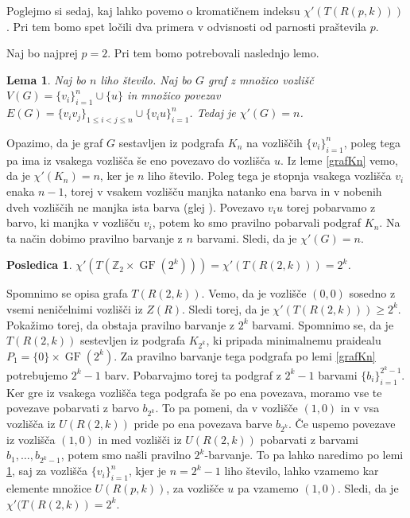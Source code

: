 \documentclass[a4paper, 12pt]{amsart}
\theoremstyle{definition} %
\theoremstyle{plain} %
\newtheorem{lema}[definicija]{Lema}
\newtheorem{posledica}[definicija]{Posledica}
\newcommand{\Z}{\mathbb Z}
\DeclareMathOperator{\GF}{GF}
\begin{document}
Poglejmo si sedaj, kaj lahko povemo o kromatičnem indeksu $\chi'(T(R(p,k)))$.  Pri tem bomo spet ločili dva primera v odvisnosti od parnosti praštevila $p$.

Naj bo najprej $p=2$. Pri tem bomo potrebovali naslednjo lemo.

\begin{lema}
\label{nLihoStozecKn}
Naj bo $n$ liho število. Naj bo $G$ graf z množico vozlišč $V(G) = \{v_i\}_{i=1}^n \cup \{u\}$ in množico povezav $E(G) = \{v_i v_j\}_{1\le i < j\le n} \cup \{v_i u\}_{i=1}^n$. Tedaj je $\chi'(G) = n$.
\end{lema}

\proof
Opazimo, da je graf $G$ sestavljen iz podgrafa $K_n$ na vozliščih $\{v_i\}_{i=1}^n$, poleg tega pa ima iz vsakega vozlišča še eno povezavo do vozlišča $u$. Iz leme \ref{grafKn} vemo, da je $\chi'(K_n)  = n$, ker je $n$ liho število. Poleg tega je stopnja vsakega vozlišča $v_i$ enaka $n-1$, torej v vsakem vozlišču manjka natanko ena barva in v nobenih dveh vozliščih ne manjka ista barva (glej \cite{diploma}). Povezavo $v_i u$ torej pobarvamo z barvo, ki manjka v vozlišču $v_i$, potem ko smo pravilno pobarvali podgraf $K_n$. Na ta način dobimo pravilno barvanje z $n$ barvami. Sledi, da je $\chi'(G) = n$.
\endproof

\begin{posledica}
\label{barvanjeT(R(2,k))}
$\chi'(T(\Z_2 \times \GF(2^k))) = \chi'(T(R(2,k))) = 2^k$.
\end{posledica}

\proof
Spomnimo se opisa grafa $T(R(2,k))$. Vemo, da je vozlišče $(0,0)$ sosedno z vsemi neničelnimi vozlišči iz $Z(R)$. Sledi torej, da je $\chi'(T(R(2,k))) \ge 2^k$. Pokažimo torej, da obstaja pravilno barvanje z $2^k$ barvami. Spomnimo se, da je $T(R(2,k))$ sestevljen iz podgrafa $K_{2^k}$, ki pripada minimalnemu praidealu $P_1 = \{0\} \times \GF(2^k)$. Za pravilno barvanje tega podgrafa po lemi \ref{grafKn} potrebujemo $2^k - 1$ barv. Pobarvajmo torej ta podgraf z $2^k - 1 $ barvami $\{b_i\}_{i=1}^{2^k - 1}$. Ker gre iz vsakega vozlišča tega podgrafa še po ena povezava, moramo vse te povezave pobarvati z barvo $b_{2^k}$. To pa pomeni, da v vozlišče $(1,0)$ in v vsa vozlišča iz $U(R(2,k))$ pride po ena povezava barve $b_{2^k}$. Če uspemo povezave iz vozlišča $(1,0)$ in med vozlišči iz $U(R(2,k))$ pobarvati z barvami $b_1,\dots, b_{2^k -1}$, potem smo našli pravilno $2^k$-barvanje. To pa lahko naredimo po lemi \ref{nLihoStozecKn}, saj za vozlišča $\{v_i\}_{i=1}^n$, kjer je $n=2^k -1$ liho število, lahko vzamemo kar elemente množice $U(R(p,k))$, za vozlišče $u$ pa vzamemo $(1,0)$.  Sledi, da je $\chi'(T(R(2,k)) = 2^k$.
\endproof
\end{document}
